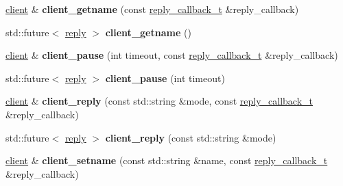 \begin{DoxyCompactItemize}
\mbox{\label{classcpp__redis_1_1client_ac4e058eaa75eb04c7a8017a779d5015e}} 
\mbox{\hyperlink{classcpp__redis_1_1client}{client}} \& {\bfseries client\+\_\+getname} (const \mbox{\hyperlink{classcpp__redis_1_1client_af7a65eb21aa25230bfbb0b0203c4fc04}{reply\+\_\+callback\+\_\+t}} \&reply\+\_\+callback)
\item 
\mbox{\label{classcpp__redis_1_1client_a89068e68b418906e9e34cb9a95f7a179}} 
std\+::future$<$ \mbox{\hyperlink{classcpp__redis_1_1reply}{reply}} $>$ {\bfseries client\+\_\+getname} ()
\item 
\mbox{\label{classcpp__redis_1_1client_acdf001d60d1d82d3f090b7c679e3183e}} 
\mbox{\hyperlink{classcpp__redis_1_1client}{client}} \& {\bfseries client\+\_\+pause} (int timeout, const \mbox{\hyperlink{classcpp__redis_1_1client_af7a65eb21aa25230bfbb0b0203c4fc04}{reply\+\_\+callback\+\_\+t}} \&reply\+\_\+callback)
\item 
\mbox{\label{classcpp__redis_1_1client_a2c73a6f9b2e3f1a0afbaca9fddd29199}} 
std\+::future$<$ \mbox{\hyperlink{classcpp__redis_1_1reply}{reply}} $>$ {\bfseries client\+\_\+pause} (int timeout)
\item 
\mbox{\label{classcpp__redis_1_1client_a5e49e9bf9bb72659b33013fac751a712}} 
\mbox{\hyperlink{classcpp__redis_1_1client}{client}} \& {\bfseries client\+\_\+reply} (const std\+::string \&mode, const \mbox{\hyperlink{classcpp__redis_1_1client_af7a65eb21aa25230bfbb0b0203c4fc04}{reply\+\_\+callback\+\_\+t}} \&reply\+\_\+callback)
\item 
\mbox{\label{classcpp__redis_1_1client_a1b378de0c1805069b9bbecd4fca4091c}} 
std\+::future$<$ \mbox{\hyperlink{classcpp__redis_1_1reply}{reply}} $>$ {\bfseries client\+\_\+reply} (const std\+::string \&mode)
\item 
\mbox{\label{classcpp__redis_1_1client_a5c7f977196c1c00e3c732615c0d86ae7}} 
\mbox{\hyperlink{classcpp__redis_1_1client}{client}} \& {\bfseries client\+\_\+setname} (const std\+::string \&name, const \mbox{\hyperlink{classcpp__redis_1_1client_af7a65eb21aa25230bfbb0b0203c4fc04}{reply\+\_\+callback\+\_\+t}} \&reply\+\_\+callback)

\end{DoxyCompactItemize}
